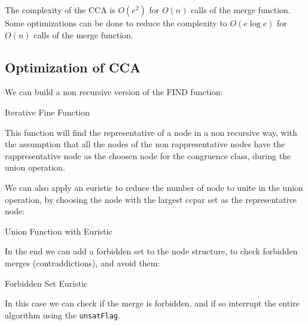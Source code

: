 The complexity of the CCA is $O(e^2)$ for $O(n)$ calls of the merge function.
Some optimizations can be done to reduce the complexity to $O(e \log e)$
for $O(n)$ calls of the merge function.

\subsection{Optimization of CCA}
\label{subsec:Optimization of CCA}

We can build a non recursive version of the FIND function:

\begin{codee}{Iterative Fine Function}
\end{codee}

This function will find the representative of a node in a non recursive way,
with the assumption that all the nodes of the non rappresentative nodes
have the rappresentative node as the choosen node for the congruence class,
during the union operation.

We can also apply an euristic to reduce the number of node to unite 
in the union operation, by choosing the node with the largest 
ccpar set as the representative node:

\begin{codee}{Union Function with Euristic}
\end{codee}

In the end we can add a forbidden set to the node structure,
to check forbidden merges (contraddictions), and avoid them:

\begin{codee}{Forbidden Set Euristic}
\end{codee}

In this case we can check if the merge is forbidden, and if so
interrupt the entire algorithm using the \texttt{unsatFlag}.

